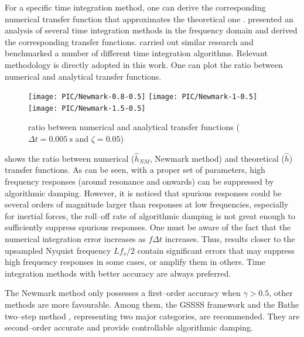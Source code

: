 For a specific time integration method, one can derive the corresponding numerical transfer function that approximates the theoretical one . \citet{Preumont1982} presented an analysis of several time integration methods in the frequency domain and derived the corresponding transfer functions. \citet{AriasTrujillo2012} carried out similar research and benchmarked a number of different time integration algorithms. Relevant methodology is directly adopted in this work. One can plot the ratio between numerical and analytical transfer functions.%
\begin{figure}[htb!]
\centering
\texttt{[image: PIC/Newmark-0.8-0.5]}
\texttt{[image: PIC/Newmark-1-0.5]}
\texttt{[image: PIC/Newmark-1.5-0.5]}
\caption{ratio between numerical and analytical transfer functions ($\Delta{}t=\SI{0.005}{\second}$ and $\zeta=0.05$)}\label{fig:newmark_alg_damping}
\end{figure}
 shows the ratio between numerical ($\hat{h}_{NM}$, Newmark method) and theoretical ($\hat{h}$) transfer functions. As can be seen, with a proper set of parameters, high frequency responses (around resonance and onwards) can be suppressed by algorithmic damping. However, it is noticed that spurious responses could be several orders of magnitude larger than responses at low frequencies, especially for inertial forces, the roll--off rate of algorithmic damping is not great enough to sufficiently suppress spurious responses. One must be aware of the fact that the numerical integration error increases as $f\Delta{}t$ increases. Thus, results closer to the upsampled Nyquist frequency $Lf_s/2$ contain significant errors that may suppress high frequency responses in some cases, or amplify them in others. Time integration methods with better accuracy are always preferred.
%

The Newmark method only possesses a first--order accuracy when $\gamma>0.5$, other methods are more favourable. Among them, the GSSSS framework \citep{Zhou2003,Zhou2006} and the Bathe two--step method \citep{Noh2019}, representing two major categories, are recommended. They are second--order accurate and provide controllable algorithmic damping.
